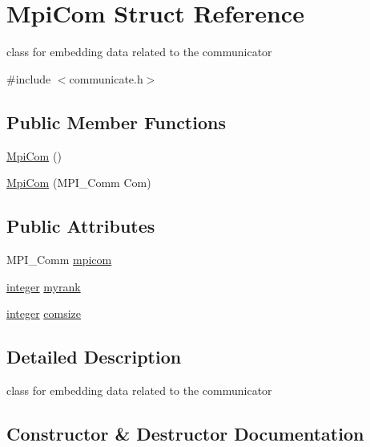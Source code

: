 \hypertarget{structMpiCom}{}\section{Mpi\+Com Struct Reference}
\label{structMpiCom}


class for embedding data related to the communicator  




{\ttfamily \#include $<$communicate.\+h$>$}

\subsection*{Public Member Functions}
\begin{DoxyCompactItemize}
\item 
\mbox{\hyperlink{structMpiCom_a32daad0b1965c35cdf7485a565cd0d8c}{Mpi\+Com}} ()
\item 
\mbox{\hyperlink{structMpiCom_a5099477d534468bdaffed3bb75e31152}{Mpi\+Com}} (M\+P\+I\+\_\+\+Comm Com)
\end{DoxyCompactItemize}
\subsection*{Public Attributes}
\begin{DoxyCompactItemize}
\item 
M\+P\+I\+\_\+\+Comm \mbox{\hyperlink{structMpiCom_aa7f455e509e222dc08a2dc22ef922b98}{mpicom}}
\item 
\mbox{\hyperlink{definitions_8h_adbd822dbdb8152553a0f77b84915bd8d}{integer}} \mbox{\hyperlink{structMpiCom_a32d8c35d746952fd9b435e25fc1fe54b}{myrank}}
\item 
\mbox{\hyperlink{definitions_8h_adbd822dbdb8152553a0f77b84915bd8d}{integer}} \mbox{\hyperlink{structMpiCom_a45b9f4f480725b1e51fad5c76273b7d2}{comsize}}
\end{DoxyCompactItemize}


\subsection{Detailed Description}
class for embedding data related to the communicator 

\subsection{Constructor \& Destructor Documentation}
\mbox{\label{structMpiCom_a32daad0b1965c35cdf7485a565cd0d8c}} 
